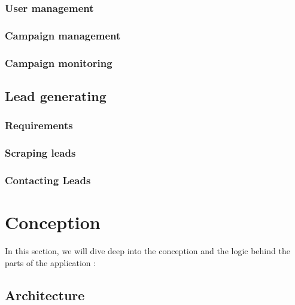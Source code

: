 \subsubsection{User management}
\subsubsection{Campaign management}
\subsubsection{Campaign monitoring}
\subsection{Lead generating}
\subsubsection{Requirements}
\subsubsection{Scraping leads}
\subsubsection{Contacting Leads}

\newpage
\section{Conception}
In this section, we will dive deep into the conception and the logic behind the parts of the application :
\subsection{Architecture}
